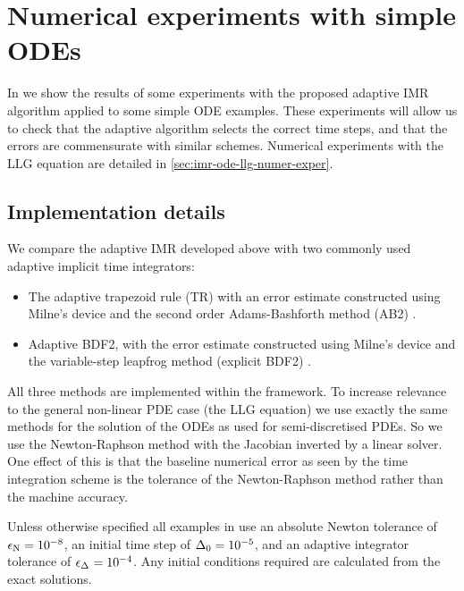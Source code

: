 \section{Numerical experiments with simple ODEs}
\label{sec:aimr-testing}



In  we show the results of some experiments with the proposed adaptive IMR algorithm applied to some simple ODE examples.
These experiments will allow us to check that the adaptive algorithm selects the correct time steps, and that the errors are commensurate with similar schemes.
Numerical experiments with the LLG equation are detailed in \cref{sec:imr-ode-llg-numer-exper}.


\subsection{Implementation details}
\label{sec:aimr-implementation}

We compare the adaptive IMR developed above with two commonly used adaptive implicit time integrators:
\begin{itemize}
\item The adaptive trapezoid rule (TR) with an error estimate constructed using Milne's device and the second order Adams-Bashforth method (AB2) \cite[707]{GreshoSani}.
\item Adaptive BDF2, with the error estimate constructed using Milne's device and the variable-step leapfrog method (\ie explicit BDF2) \cite[715]{GreshoSani}.
\end{itemize}

All three methods are implemented within the \oomph framework.
To increase relevance to the general non-linear PDE case (\ie the LLG equation) we use exactly the same methods for the solution of the ODEs as used for semi-discretised PDEs.
So we use the Newton-Raphson method with the Jacobian inverted by a linear solver.
One effect of this is that the baseline numerical error as seen by the time integration scheme is the tolerance of the Newton-Raphson method rather than the machine accuracy.

Unless otherwise specified all examples in  use an absolute Newton tolerance of $\epsilon_{\mathrm{N}} = 10^{-8}$, an initial time step of $\Delta_{0} = 10^{-5}$, and an adaptive integrator tolerance of $\epsilon_{\Delta_{}} = 10^{-4}$.
Any initial conditions required are calculated from the exact solutions.


